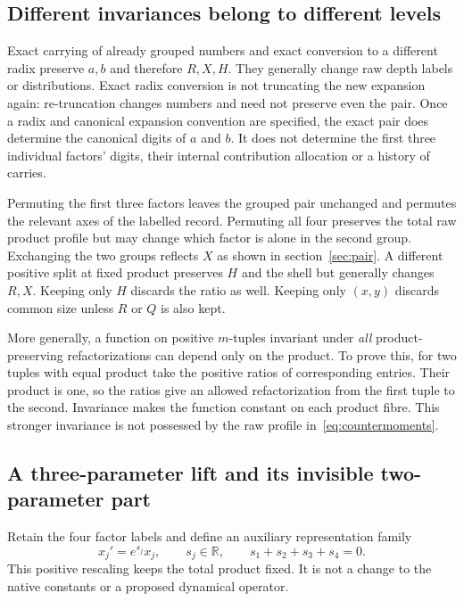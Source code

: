 \documentclass[11pt,a4paper]{article}
\newcommand{\RR}{\mathbb R}
\begin{document}
\subsection{Different invariances belong to different levels}
Exact carrying of already grouped numbers and exact conversion to a different radix preserve $a,b$ and therefore $R,X,H$. They generally change raw depth labels or distributions. Exact radix conversion is not truncating the new expansion again: re-truncation changes numbers and need not preserve even the pair. Once a radix and canonical expansion convention are specified, the exact pair does determine the canonical digits of $a$ and $b$. It does not determine the first three individual factors' digits, their internal contribution allocation or a history of carries.

Permuting the first three factors leaves the grouped pair unchanged and permutes the relevant axes of the labelled record. Permuting all four preserves the total raw product profile but may change which factor is alone in the second group. Exchanging the two groups reflects $X$ as shown in section~\ref{sec:pair}. A different positive split at fixed product preserves $H$ and the shell but generally changes $R,X$. Keeping only $H$ discards the ratio as well. Keeping only $(x,y)$ discards common size unless $R$ or $Q$ is also kept.

More generally, a function on positive $m$-tuples invariant under \emph{all} product-preserving refactorizations can depend only on the product. To prove this, for two tuples with equal product take the positive ratios of corresponding entries. Their product is one, so the ratios give an allowed refactorization from the first tuple to the second. Invariance makes the function constant on each product fibre. This stronger invariance is not possessed by the raw profile in~\eqref{eq:countermoments}.

\subsection{A three-parameter lift and its invisible two-parameter part}
Retain the four factor labels and define an auxiliary representation family
\begin{equation}
 x_j'=e^{s_j}x_j,\qquad s_j\in\RR,\qquad
 s_1+s_2+s_3+s_4=0.
 \label{eq:lift}
\end{equation}
This positive rescaling keeps the total product fixed. It is not a change to the native constants or a proposed dynamical operator.
\end{document}
